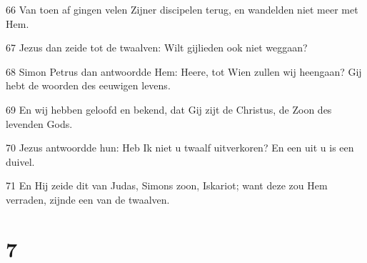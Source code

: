 \par 66 Van toen af gingen velen Zijner discipelen terug, en wandelden niet meer met Hem.
\par 67 Jezus dan zeide tot de twaalven: Wilt gijlieden ook niet weggaan?
\par 68 Simon Petrus dan antwoordde Hem: Heere, tot Wien zullen wij heengaan? Gij hebt de woorden des eeuwigen levens.
\par 69 En wij hebben geloofd en bekend, dat Gij zijt de Christus, de Zoon des levenden Gods.
\par 70 Jezus antwoordde hun: Heb Ik niet u twaalf uitverkoren? En een uit u is een duivel.
\par 71 En Hij zeide dit van Judas, Simons zoon, Iskariot; want deze zou Hem verraden, zijnde een van de twaalven.

\chapter{7}

